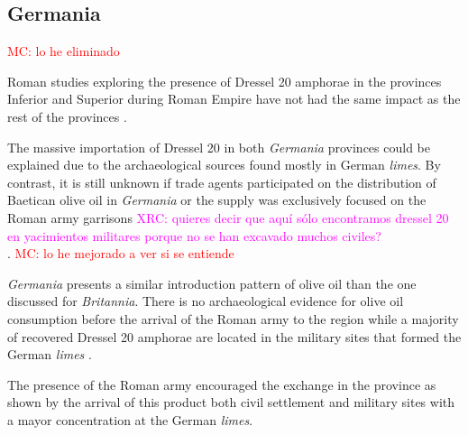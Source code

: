\documentclass[review]{elsarticle}
\newcommand{\memo}[2]{\textcolor{#1}{#2}}
\newcommand{\maria}[1]{\memo{red}{MC: #1\\}}
\newcommand{\xavi}[1]{\memo{magenta}{XRC: #1\\}}
\begin{document}

\subsection{Germania}

\maria{lo he eliminado}

Roman studies exploring the presence of Dressel 20 amphorae in the provinces Inferior and Superior during Roman Empire have not had the same impact as the rest of the provinces \citep[293]{remesal_baetica_2002}.

The massive importation of Dressel 20 in both \textit{Germania} provinces could be explained due to the archaeological sources found mostly in German \textit{limes}. 
By contrast, it is still unknown if trade agents participated on the distribution of Baetican olive oil in \textit{Germania} or the supply was exclusively focused on the Roman army garrisons\citep[156]{remesal_germn_2010}
\xavi{quieres decir que aquí sólo encontramos dressel 20 en yacimientos militares porque no se han excavado muchos civiles?}.
\maria{lo he mejorado a ver si se entiende}




\textit{Germania} presents a similar introduction pattern of olive oil than the one discussed for \textit{Britannia}. There is no archaeological evidence for olive oil consumption before the arrival of the Roman army to the region while a majority of recovered Dressel 20 amphorae are located in the military sites that formed the German \textit{limes} \citep{remesal_germaniaengl_2002}.


The presence of the Roman army encouraged the exchange in the province as shown by the arrival of this product both civil settlement and military sites with a mayor concentration at the German \textit{limes}.
\end{document}
